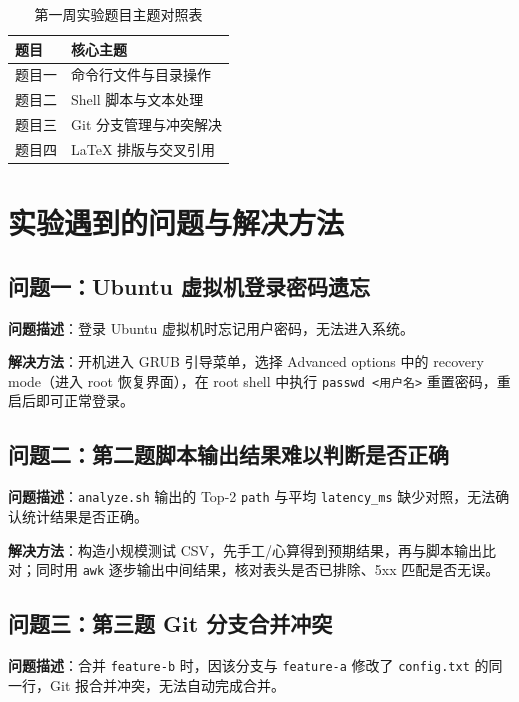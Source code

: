 \documentclass[a4paper, 12pt]{article}
\begin{document}
\begin{table}[h]
  \centering
  \begin{tabular}{ll}
    \toprule
    \textbf{题目} & \textbf{核心主题} \\
    \midrule
    题目一 & 命令行文件与目录操作 \\
    题目二 & Shell 脚本与文本处理 \\
    题目三 & Git 分支管理与冲突解决 \\
    题目四 & \LaTeX{} 排版与交叉引用 \\
    \bottomrule
  \end{tabular}
  \caption{第一周实验题目主题对照表}
  \label{tab:overview}
\end{table}

\section{实验遇到的问题与解决方法}

\subsection{问题一：Ubuntu 虚拟机登录密码遗忘}

\textbf{问题描述}：登录 Ubuntu 虚拟机时忘记用户密码，无法进入系统。

\textbf{解决方法}：开机进入 GRUB 引导菜单，选择 Advanced options 中的 recovery mode（进入 root 恢复界面），在 root shell 中执行 \texttt{passwd <用户名>} 重置密码，重启后即可正常登录。

\subsection{问题二：第二题脚本输出结果难以判断是否正确}

\textbf{问题描述}：\texttt{analyze.sh} 输出的 Top-2 \texttt{path} 与平均 \texttt{latency\_ms} 缺少对照，无法确认统计结果是否正确。

\textbf{解决方法}：构造小规模测试 CSV，先手工/心算得到预期结果，再与脚本输出比对；同时用 \texttt{awk} 逐步输出中间结果，核对表头是否已排除、5xx 匹配是否无误。

\subsection{问题三：第三题 Git 分支合并冲突}

\textbf{问题描述}：合并 \texttt{feature-b} 时，因该分支与 \texttt{feature-a} 修改了 \texttt{config.txt} 的同一行，Git 报合并冲突，无法自动完成合并。
\end{document}
